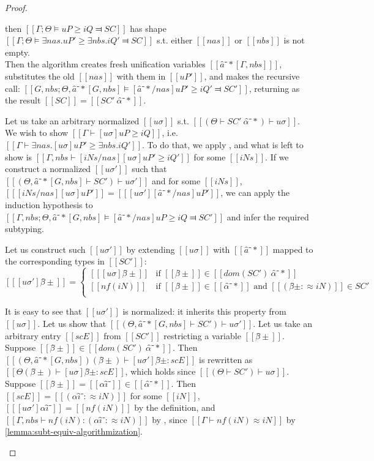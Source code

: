 \begin{proof}
\begin{caseof}
    \item \label{case:pos-subt-soundness:exists}
        then
        $[[Γ ; Θ ⊨ uP ≥ iQ ⫤ SC]]$ has shape $[[Γ;Θ ⊨ ∃nas.uP' ≥ ∃nbs.iQ' ⫤ SC]]$ s.t. either 
        $[[nas]]$ or $[[nbs]]$ is not empty.\\
        Then the algorithm creates fresh unification variables $[[â⁻*[Γ,nbs] ]]$, 
        substitutes the old $[[nas]]$ with them in $[[uP']]$, and makes the recursive call:
        $[[G, nbs; Θ, â⁻*[G, nbs] ⊨ [â⁻*/nas] uP' ≥ iQ' ⫤ SC']]$, returning as the result
        $[[SC]] = [[SC' \ {α̂⁻*}]]$.

        Let us take an arbitrary normalized $[[uσ]]$ s.t. $[[(Θ  ⊢  SC' \ {α̂⁻*}) ⊢ uσ]]$.
        We wish to show $[[Γ ⊢ [uσ]uP ≥ iQ]]$, i.e. $[[Γ ⊢ ∃nas.[uσ]uP' ≥ ∃nbs.iQ']]$.
        To do that, we apply , and what is left to show is
        $[[Γ, nbs ⊢ [iNs/nas][uσ]uP' ≥ iQ']]$ for some $[[iNs]]$.
        If we construct a normalized $[[uσ']]$ such that $[[(Θ, â⁻*[G, nbs] ⊢ SC') ⊢ uσ']]$
        and for some $[[iNs]]$, $[[ [iNs/nas][uσ]uP' ]] = [[ [uσ'][â⁻*/nas]uP' ]]$,
        we can apply the induction hypothesis to 
        $[[Γ, nbs; Θ, â⁻*[G, nbs] ⊨ [â⁻*/nas] uP ≥ iQ ⫤ SC']]$ and infer 
        the required subtyping.

        Let us construct such $[[uσ']]$ by extending $[[uσ]]$ with $[[â⁻*]]$
        mapped to the corresponding types in $[[SC']]$:
        $$
        [[ [uσ']β̂± ]]  = 
            \begin{cases}
               [[ [uσ]β̂± ]] & \text{if } [[β̂±]] \in [[dom(SC') \ {α̂⁻*}]]  \\
               [[ nf(iN) ]] & \text{if } [[β̂±]] \in [[α̂⁻*]] \text{ and } [[(β̂± :≈ iN)]] \in SC' \\
            \end{cases}
        $$

        It is easy to see that $[[uσ']]$ is normalized: it inherits this property from 
        $[[uσ]]$.
        Let us show that $[[(Θ, â⁻*[G, nbs]  ⊢ SC') ⊢ uσ' ]] $.
        Let us take an arbitrary entry $[[scE]]$ from $[[SC']]$ restricting a variable $[[β̂±]]$.
        Suppose $[[β̂±]] \in [[dom(SC') \ {α̂⁻*}]]$. Then
        $[[ (Θ, â⁻*[G, nbs])(β̂±) ⊢ [uσ']β̂± : scE ]]$ is
        rewritten as $[[ Θ(β̂±) ⊢ [uσ]β̂± : scE ]]$, which holds since $[[(Θ  ⊢  SC') ⊢ uσ]]$.
        Suppose $[[β̂±]] = [[αî⁻]] \in [[α̂⁻*]]$. Then
        $[[scE]] = [[(αî⁻ :≈ iN)]]$ for some $[[iN]]$, 
        $[[ [uσ']αî⁻ ]] = [[ nf(iN) ]]$ by the definition,
        and $[[ Γ, nbs ⊢ nf(iN) : (αî⁻ :≈ iN) ]]$ by ,
        since $[[Γ ⊢ nf(iN) ≈ iN]]$ by \cref{lemma:subt-equiv-algorithmization}.


\end{caseof}
\end{proof}
